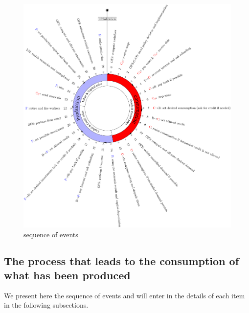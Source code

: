 \documentclass{book}
\begin{document}
\begin{figure}[htp]
	\centering
\includegraphics[scale=0.5]{visual1.pdf}
	\caption{sequence of events}
	\label{fig:clockcolor}
\end{figure}

\subsection{The process that leads to the consumption of what has been produced}
We present here the sequence of events and will enter in the details of each item in the following subsections.
\end{document}
